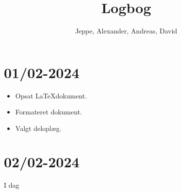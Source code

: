 \documentclass[12pt, a4paper]{article}
\title{Logbog}
\author{Jeppe, Alexander, Andreas, David}
\date{}
\begin{document}
    \maketitle
    \tableofcontents
    \newpage

    \section{01/02-2024}
        \begin{itemize}
            \item Opsat \LaTeX dokument.
            \item Formateret dokument.
            \item Valgt deloplæg.
        \end{itemize}

    \section{02/02-2024}
        I dag
\end{document}
